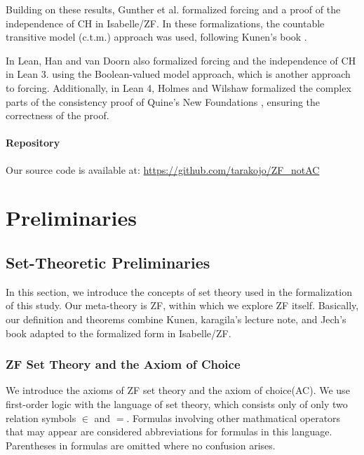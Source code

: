 \documentclass{report}
\begin{document}
Building on these results, Gunther et al. formalized forcing and a proof of the independence of CH \cite{gunther_forcing,gunther_independence} in Isabelle/ZF.
In these formalizations, the countable transitive model (c.t.m.) approach was used, following Kunen's book \cite{kunen2011}.

In Lean, Han and van Doorn also formalized forcing and the independence of CH \cite{flypitch} in Lean 3.
using the Boolean-valued model approach, which is another approach to forcing.
Additionally, in Lean 4, Holmes and Wilshaw formalized the complex parts of the consistency proof of Quine's New Foundations \cite{NF_consistency}, ensuring the correctness of the proof.

\subsubsection{Repository}
Our source code is available at: \url{https://github.com/tarakojo/ZF_notAC}

\chapter{Preliminaries}
\section{Set-Theoretic Preliminaries}
In this section, we introduce the concepts of set theory used in the formalization of this study.
Our meta-theory is ZF, within which we explore ZF itself. 
Basically, our definition and theorems combine Kunen\cite{kunen2011}, karagila's lecture note\cite{karagila}, and Jech's book\cite{jech_AC}
adapted to the formalized form in Isabelle/ZF.


\subsection{ZF Set Theory and the Axiom of Choice}
We introduce the axioms of ZF set theory and the axiom of choice(AC).
We use first-order logic with the language of set theory, which consists only of only two relation symbols $\in$ and $=$. 
Formulas involving other mathmatical operators that may appear are considered abbreviations for formulas in this language.
Parentheses in formulas are omitted where no confusion arises.
\end{document}

